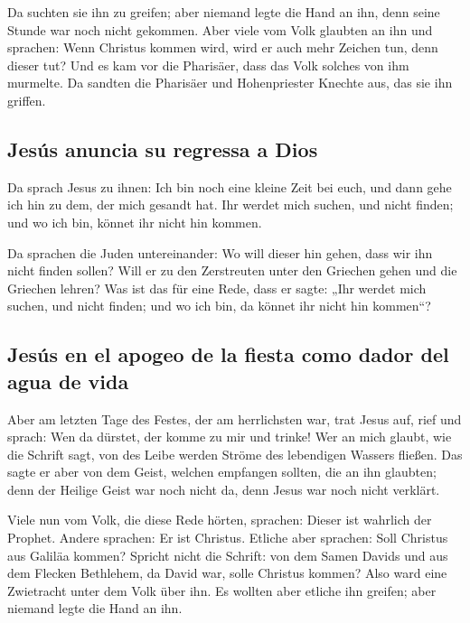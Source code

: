  Da suchten sie ihn zu greifen; aber niemand legte die
Hand an ihn, denn seine Stunde war noch nicht gekommen. 
Aber viele vom Volk glaubten an ihn und sprachen: Wenn Christus kommen
wird, wird er auch mehr Zeichen tun, denn dieser tut? 
Und es kam vor die Pharisäer, dass das Volk solches von ihm murmelte. Da
sandten die Pharisäer und Hohenpriester Knechte aus, das sie ihn
griffen.

\hypertarget{jesuxfas-anuncia-su-regressa-a-dios}{%
\subsection{Jesús anuncia su regressa a
Dios}\label{jesuxfas-anuncia-su-regressa-a-dios}}

 Da sprach Jesus zu ihnen: Ich bin noch eine kleine Zeit
bei euch, und dann gehe ich hin zu dem, der mich gesandt hat.
 Ihr werdet mich suchen, und nicht finden; und wo ich
bin, könnet ihr nicht hin kommen.

 Da sprachen die Juden untereinander: Wo will dieser hin
gehen, dass wir ihn nicht finden sollen? Will er zu den Zerstreuten
unter den Griechen gehen und die Griechen lehren?  Was
ist das für eine Rede, dass er sagte: „Ihr werdet mich suchen, und nicht
finden; und wo ich bin, da könnet ihr nicht hin kommen``?

\hypertarget{jesuxfas-en-el-apogeo-de-la-fiesta-como-dador-del-agua-de-vida}{%
\subsection{Jesús en el apogeo de la fiesta como dador del agua de
vida}\label{jesuxfas-en-el-apogeo-de-la-fiesta-como-dador-del-agua-de-vida}}

 Aber am letzten Tage des Festes, der am herrlichsten
war, trat Jesus auf, rief und sprach: Wen da dürstet, der komme zu mir
und trinke!  Wer an mich glaubt, wie die Schrift sagt,
von des Leibe werden Ströme des lebendigen Wassers fließen.
 Das sagte er aber von dem Geist, welchen empfangen
sollten, die an ihn glaubten; denn der Heilige Geist war noch nicht da,
denn Jesus war noch nicht verklärt.

 Viele nun vom Volk, die diese Rede hörten, sprachen:
Dieser ist wahrlich der Prophet.  Andere sprachen: Er ist
Christus. Etliche aber sprachen: Soll Christus aus Galiläa kommen?
 Spricht nicht die Schrift: von dem Samen Davids und aus
dem Flecken Bethlehem, da David war, solle Christus kommen?
 Also ward eine Zwietracht unter dem Volk über ihn.
 Es wollten aber etliche ihn greifen; aber niemand legte
die Hand an ihn.

